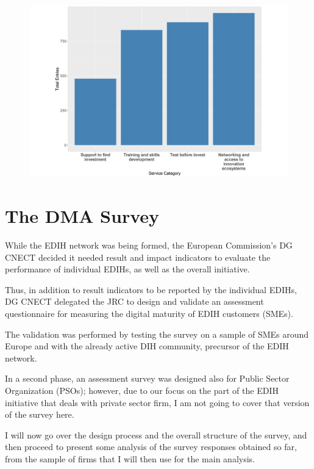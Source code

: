 \documentclass[12pt]{report}
\begin{document}
\begin{figure}[h]
    \centering
    \includegraphics[width=1\linewidth]{../Output/service_categ_plot.png}
    \caption{}
    \label{fig:edih-services-table}
\end{figure}






\newpage
\chapter{The DMA Survey}

\par While the EDIH network was being formed, the European Commission's DG CNECT decided it needed result and impact indicators to evaluate the performance of individual EDIHs, as well as the overall initiative. 
\par Thus, in addition to result indicators to be reported by the individual EDIHs, DG CNECT delegated the JRC to design and validate an assessment questionnaire for measuring the digital maturity of EDIH customers (SMEs).
\par The validation was performed by testing the survey on a sample of SMEs around Europe and with the already active DIH community, precursor of the EDIH network.
\par In a second phase, an assessment survey was designed also for Public Sector Organization (PSOs); however, due to our focus on the part of the EDIH initiative that deals with private sector firm, I am not going to cover that version of the survey here.

\par I will now go over the design process and the overall structure of the survey, and then proceed to present some analysis of the survey responses obtained so far, from the sample of firms that I will then use for the main analysis.
\end{document}
